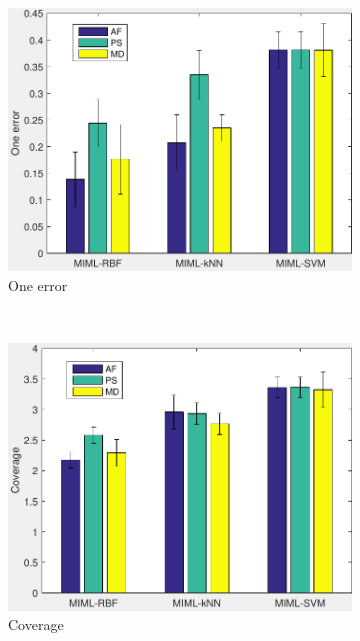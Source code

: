 \begin{figure}[htb!]
              \begin{subfigure}[b]{0.45\textwidth}
                \includegraphics[width=\textwidth]{image/Ch6/oneError.pdf} 
                \caption{One error}               
        \end{subfigure}  
~
              \begin{subfigure}[b]{0.45\textwidth}
                \includegraphics[width=\textwidth]{image/Ch6/coverage.pdf} 
                \caption{Coverage}                
        \end{subfigure}          
   \\
              \begin{subfigure}[b]{0.45\textwidth}

\end{subfigure}
\end{figure}
